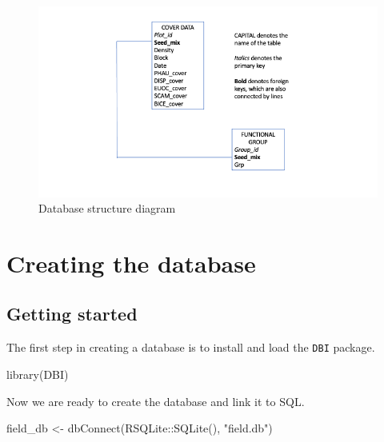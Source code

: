 \documentclass[
]{book}
\newenvironment{Shaded}{\begin{snugshade}}{\end{snugshade}}
\newcommand{\FunctionTok}[1]{\textcolor[rgb]{0.00,0.00,0.00}{#1}}
\newcommand{\NormalTok}[1]{#1}
\newcommand{\OtherTok}[1]{\textcolor[rgb]{0.56,0.35,0.01}{#1}}
\newcommand{\SpecialCharTok}[1]{\textcolor[rgb]{0.00,0.00,0.00}{#1}}
\newcommand{\StringTok}[1]{\textcolor[rgb]{0.31,0.60,0.02}{#1}}
\begin{document}
\begin{figure}

{\centering \includegraphics[width=1\linewidth]{Feldman_database_structure_updated} 

}

\caption{Database structure diagram}\label{fig:image}
\end{figure}

\hypertarget{creating-the-database}{%
\section{Creating the database}\label{creating-the-database}}

\hypertarget{getting-started}{%
\subsection{Getting started}\label{getting-started}}

The first step in creating a database is to install and load the \texttt{DBI} package.

\begin{Shaded}
\begin{Highlighting}[]
\FunctionTok{library}\NormalTok{(DBI)}
\end{Highlighting}
\end{Shaded}

Now we are ready to create the database and link it to SQL.

\begin{Shaded}
\begin{Highlighting}[]
\NormalTok{field\_db }\OtherTok{\textless{}{-}} \FunctionTok{dbConnect}\NormalTok{(RSQLite}\SpecialCharTok{::}\FunctionTok{SQLite}\NormalTok{(),}
                      \StringTok{"field.db"}\NormalTok{)}
\end{Highlighting}
\end{Shaded}
\end{document}
